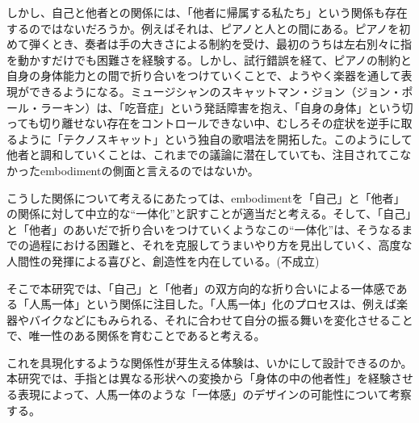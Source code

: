 
しかし、自己と他者との関係には、「他者に帰属する私たち」という関係も存在するのではないだろうか。例えばそれは、ピアノと人との間にある。ピアノを初めて弾くとき、奏者は手の大きさによる制約を受け、最初のうちは左右別々に指を動かすだけでも困難さを経験する。しかし、試行錯誤を経て、ピアノの制約と自身の身体能力との間で折り合いをつけていくことで、ようやく楽器を通して表現ができるようになる。ミュージシャンのスキャットマン・ジョン（ジョン・ポール・ラーキン）は、「吃音症」という発話障害を抱え、「自身の身体」という切っても切り離せない存在をコントロールできない中、むしろその症状を逆手に取るように「テクノスキャット」という独自の歌唱法を開拓した。このようにして他者と調和していくことは、これまでの議論に潜在していても、注目されてこなかったembodimentの側面と言えるのではないか。

こうした関係について考えるにあたっては、embodimentを「自己」と「他者」の関係に対して中立的な``一体化''と訳すことが適当だと考える。そして、「自己」と「他者」のあいだで折り合いをつけていくようなこの``一体化''は、そうなるまでの過程における困難と、それを克服してうまいやり方を見出していく、高度な人間性の発揮による喜びと、創造性を内在している。(不成立)

そこで本研究では、「自己」と「他者」の双方向的な折り合いによる一体感である「人馬一体」という関係に注目した。「人馬一体」化のプロセスは、例えば楽器やバイクなどにもみられる、それに合わせて自分の振る舞いを変化させることで、唯一性のある関係を育むことであると考える。

これを具現化するような関係性が芽生える体験は、いかにして設計できるのか。本研究では、手指とは異なる形状への変換から「身体の中の他者性」を経験させる表現によって、人馬一体のような「一体感」のデザインの可能性について考察する。


